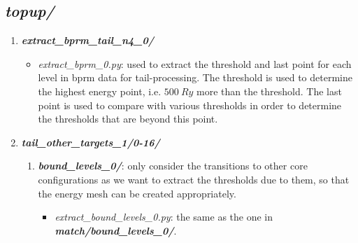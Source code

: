 \subsection{\textit{topup/}}
\begin{enumerate}
	\item \textbf{\textit{extract\_bprm\_tail\_n4\_0/}}
		\begin{itemize}
			\item \textit{extract\_bprm\_0.py}: used to extract the threshold and last point for each level in bprm data for tail-processing. The threshold is used to determine the highest energy point, i.e. $500~Ry$ more than the threshold. The last point is used to compare with various thresholds in order to determine the thresholds that are beyond this point.
		\end{itemize}
	
	\item \textbf{\textit{tail\_other\_targets\_1/0-16/}}
		\begin{enumerate}
			\item \textbf{\textit{bound\_levels\_0/}}: only consider the transitions to other core configurations as we want to extract the thresholds due to them, so that the energy mesh can be created appropriately.
				\begin{itemize}
					\item \textit{extract\_bound\_levels\_0.py}: the same as the one in \textbf{\textit{match/bound\_levels\_0/}}.
				\end{itemize}
		

\end{enumerate}
\end{enumerate}
